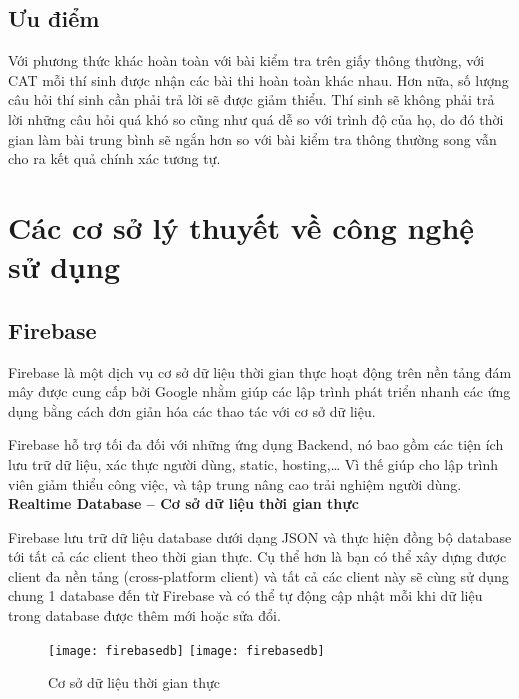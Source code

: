 \subsection{Ưu điểm}
Với phương thức khác hoàn toàn với bài kiểm tra trên giấy thông thường, với CAT mỗi thí sinh được nhận các bài thi hoàn toàn khác nhau. Hơn nữa, số lượng câu hỏi thí sinh cần phải trả lời sẽ được giảm thiểu. Thí sinh sẽ không phải trả lời những câu hỏi quá khó so cũng như quá dễ so với trình độ của họ, do đó thời gian làm bài trung bình sẽ ngắn hơn so với bài kiểm tra thông thường song vẫn cho ra kết quả chính xác tương tự.

\section{Các cơ sở lý thuyết về công nghệ sử dụng}
\subsection{Firebase}
Firebase là một dịch vụ cơ sở dữ liệu thời gian thực hoạt động trên nền tảng đám mây được cung cấp bởi Google nhằm giúp các lập trình phát triển nhanh các ứng dụng bằng cách đơn giản hóa các thao tác với cơ sở dữ liệu.

Firebase hỗ trợ tối đa đối với những ứng dụng Backend, nó bao gồm các tiện ích lưu trữ dữ liệu, xác thực người dùng, static, hosting,… Vì thế giúp cho lập trình viên giảm thiểu công việc, và tập trung nâng cao trải nghiệm người dùng.\\

\textbf{Realtime Database – Cơ sở dữ liệu thời gian thực}
 
Firebase lưu trữ dữ liệu database dưới dạng JSON và thực hiện đồng bộ database tới tất cả các client theo thời gian thực. Cụ thể hơn là bạn có thể xây dựng được client đa nền tảng (cross-platform client) và tất cả các client này sẽ cùng sử dụng chung 1 database đến từ Firebase và có thể tự động cập nhật mỗi khi dữ liệu trong database được thêm mới hoặc sửa đổi.
 
 \begin{figure}[!htbp]
  \begin{center}
    \ifpdf
      \texttt{[image: firebasedb]}
    \else
      \texttt{[image: firebasedb]}
    \fi
    \caption{Cơ sở dữ liệu thời gian thực }
    \label{FirebaseDB}
  \end{center}
\end{figure}

